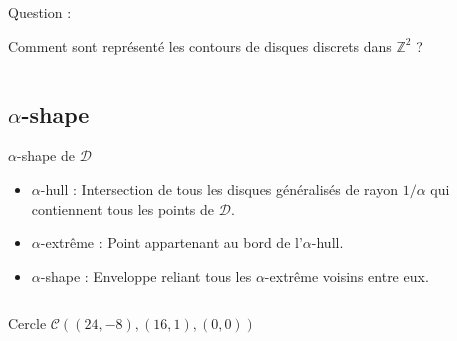 \documentclass{beamer}
\begin{document}
\begin{frame}
\begin{columns}[t]
\begin{column}{5cm}
        {
          \begin{block}{Question :}
            \begin{center}  
              \alert{Comment sont représenté les contours de disques discrets dans $\mathbb{Z}^{2}$ ?}
            \end{center}
          \end{block}
        }
      \end{column}
    \end{columns}
\end{frame}

\subsection{$\alpha$-shape}
\begin{frame}
  \begin{block}{$\alpha$-shape de $\mathcal{D}$}
    \begin{itemize}
      \item $\alpha$-hull : Intersection de tous les disques généralisés de rayon $1/\alpha$ qui contiennent tous les points de $\mathcal{D}$.
      \item $\alpha$-extrême : Point appartenant au bord de l'$\alpha$-hull.
      \item $\alpha$-shape : Enveloppe reliant tous les $\alpha$-extrême voisins entre eux.
    \end{itemize}
  \end{block}
\begin{columns}[t]
  \begin{column}{4cm}
    \begin{exampleblock}{Cercle}
      $\mathcal{C} \left( (24,-8), (16,1), (0,0) \right)$\\
       

\end{exampleblock}
\end{column}
\end{columns}
\end{frame}
\end{document}
